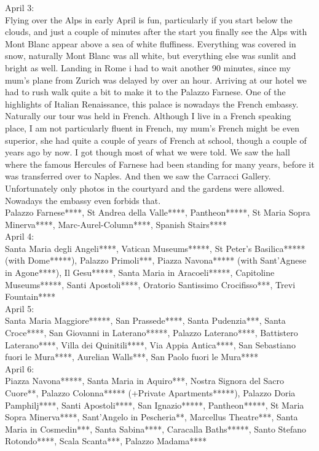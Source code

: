 April 3:\\
Flying over the Alps in early April is fun, particularly if you start below the clouds, and just a couple of minutes after the start you finally see the Alps with Mont Blanc appear above a sea of white fluffiness. Everything was covered in snow, naturally Mont Blanc was all white, but everything else was sunlit and bright as well. Landing in Rome i had to wait another 90 minutes, since my mum's plane from Zurich was delayed by over an hour. Arriving at our hotel we had to rush walk quite a bit to make it to the Palazzo Farnese. One of the highlights of Italian Renaissance, this palace is nowadays the French embassy. Naturally our tour was held in French. Although I live in a French speaking place, I am not particularly fluent in French, my mum's French might be even superior, she had quite a couple of years of French at school, though a couple of years ago by now. I got though most of what we were told. We saw the hall where the famous Hercules of Farnese had been standing for many years, before it was transferred over to Naples. And then we saw the Carracci Gallery. Unfortunately only photos in the courtyard and the gardens were allowed. Nowadays the embassy even forbids that.\\

Palazzo Farnese****, St Andrea della Valle****, Pantheon*****, St Maria Sopra Minerva****, Marc-Aurel-Column****, Spanish Stairs****\\

April 4:\\
Santa Maria degli Angeli****, Vatican Museums*****, St Peter's Basilica***** (with Dome*****), Palazzo Primoli***, Piazza Navona***** (with Sant'Agnese in Agone****), Il Gesu*****, Santa Maria in Aracoeli*****, Capitoline Museums*****, Santi Apostoli****, Oratorio Santissimo Crocifisso***, Trevi Fountain****\\

April 5:\\
Santa Maria Maggiore*****, San Prassede****, Santa Pudenzia***, Santa Croce****, San Giovanni in Laterano*****, Palazzo Laterano****, Battistero Laterano****, Villa dei Quinitili****, Via Appia Antica****, San Sebastiano fuori le Mura****, Aurelian Walls***, San Paolo fuori le Mura****\\

April 6:\\
Piazza Navona*****, Santa Maria in Aquiro***, Nostra Signora del Sacro Cuore**, Palazzo Colonna***** (+Private Apartments*****), Palazzo Doria Pamphilj****, Santi Apostoli****, San Ignazio*****, Pantheon*****, St Maria Sopra Minerva****, Sant'Angelo in Pescheria**, Marcellus Theatre***, Santa Maria in Cosmedin***, Santa Sabina****, Caracalla Baths*****, Santo Stefano Rotondo****, Scala Scanta***, Palazzo Madama****\\

